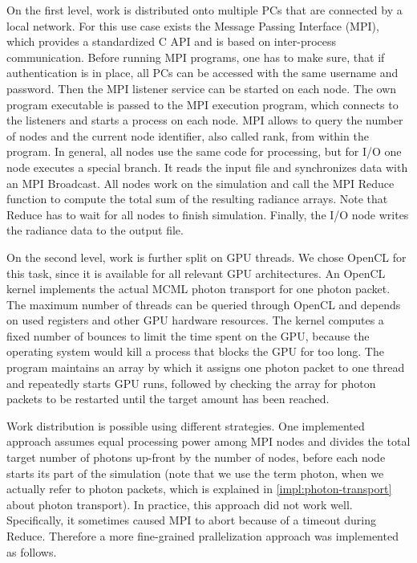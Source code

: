 \documentclass[]{article}
\begin{document}
On the first level, work is distributed onto multiple PCs that are connected by a local network. For this use case exists the Message Passing Interface (MPI), which provides a standardized C API and is based on inter-process communication. Before running MPI programs, one has to make sure, that if authentication is in place, all PCs can be accessed with the same username and password. Then the MPI listener service can be started on each node. The own program executable is passed to the MPI execution program, which connects to the listeners and starts a process on each node. MPI allows to query the number of nodes and the current node identifier, also called rank, from within the program. In general, all nodes use the same code for processing, but for I/O one node executes a special branch. It reads the input file and synchronizes data with an MPI Broadcast. All nodes work on the simulation and call the MPI Reduce function to compute the total sum of the resulting radiance arrays. Note that Reduce has to wait for all nodes to finish simulation. Finally, the I/O node writes the radiance data to the output file.

On the second level, work is further split on GPU threads. We chose OpenCL for this task, since it is available for all relevant GPU architectures. An OpenCL kernel implements the actual MCML photon transport for one photon packet. The maximum number of threads can be queried through OpenCL and depends on used registers and other GPU hardware resources. The kernel computes a fixed number of bounces to limit the time spent on the GPU, because the operating system would kill a process that blocks the GPU for too long. The program maintains an array by which it assigns one photon packet to one thread and repeatedly starts GPU runs, followed by checking the array for photon packets to be restarted until the target amount has been reached.

Work distribution is possible using different strategies. One implemented approach assumes equal processing power among MPI nodes and divides the total target number of photons up-front by the number of nodes, before each node starts its part of the simulation (note that we use the term photon, when we actually refer to photon packets, which is explained in \autoref{impl:photon-transport} about photon transport). In practice, this approach did not work well. Specifically, it sometimes caused MPI to abort because of a timeout during Reduce. Therefore a more fine-grained prallelization approach was implemented as follows.
\end{document}
